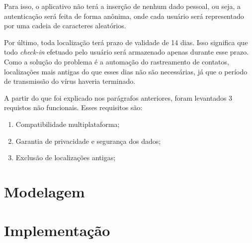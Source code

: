 Para isso, o aplicativo não terá a inserção de nenhum dado pessoal, ou seja, a autenticação será feita de forma anônima, onde cada usuário será representado por uma cadeia de caracteres aleatórios.

Por último, toda localização terá prazo de validade de 14 dias. Isso significa que todo \textit{check-in} efetuado pelo usuário será armazenado apenas durante esse prazo. Como a solução do problema é a automação do rastreamento de contatos, localizações mais antigas do que esses dias não são necessárias, já que o período de transmissão do vírus haveria terminado.

A partir do que foi explicado nos parágrafos anteriores, foram levantados 3 requistos não funcionais. Esses requisitos são:
\begin{enumerate}
  \item Compatibilidade multiplataforma;
  \item Garantia de privacidade e segurança dos dados;
  \item Exclusão de localizações antigas;
\end{enumerate}

\section{Modelagem}\label{sec:modelagem}

\section{Implementação}\label{sec:implementacao}
